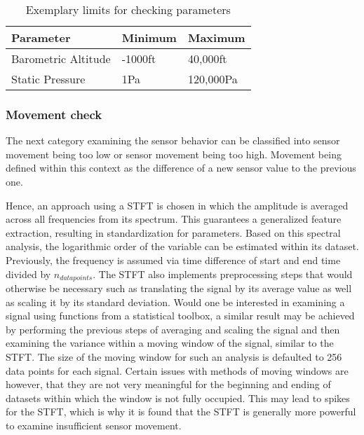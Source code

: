 \begin{table}[]
    \centering
    \begin{tabular}{@{}lll@{}}
        \toprule
        Parameter           & Minimum & Maximum   \\ \midrule
        Barometric Altitude & -1000ft & 40,000ft  \\
        Static Pressure     & 1Pa     & 120,000Pa \\ \bottomrule
    \end{tabular}
    \caption{Exemplary limits for checking parameters}
    \label{tab:level_2_range}
\end{table}

\subsubsection{Movement check}
\label{chap:4-level_2_movement}
The next category examining the sensor behavior can be classified into sensor movement being too low or sensor movement being too high. Movement being defined within this context as the difference of a new sensor value to the previous one.

Hence, an approach using a STFT is chosen in which the amplitude is averaged across all frequencies from its spectrum. This guarantees a generalized feature extraction, resulting in standardization for parameters. Based on this spectral analysis, the logarithmic order of the variable can be estimated within its dataset. Previously, the frequency is assumed via time difference of start and end time divided by $n_{datapoints}$. The STFT also implements preprocessing steps that would otherwise be necessary such as translating the signal by its average value as well as scaling it by its standard deviation. Would one be interested in examining a signal using functions from a statistical toolbox, a similar result may be achieved by performing the previous steps of averaging and scaling the signal and then examining the variance within a moving window of the signal, similar to the STFT. The size of the moving window for such an analysis is defaulted to 256 data points for each signal. Certain issues with methods of moving windows are however, that they are not very meaningful for the beginning and ending of datasets within which the window is not fully occupied. This may lead to spikes for the STFT, which is why it is found that the STFT is generally more powerful to examine insufficient sensor movement.

